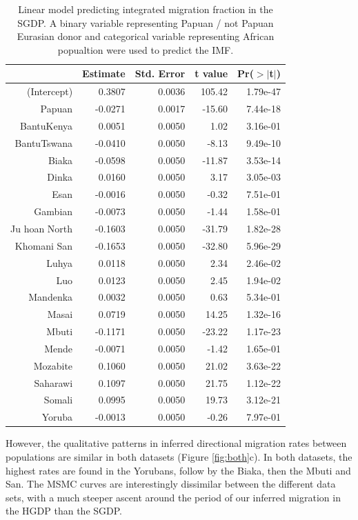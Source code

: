 \documentclass{article}
\begin{document}
\begin{table}[ht]
\centering
\begin{tabular}{rrrrr}
  \hline
 & Estimate & Std. Error & t value & Pr($>$$|$t$|$) \\ 
  \hline
(Intercept) & 0.3807 & 0.0036 & 105.42 & 1.79e-47 \\ 
  Papuan & -0.0271 & 0.0017 & -15.60 & 7.44e-18 \\ 
  BantuKenya & 0.0051 & 0.0050 & 1.02 & 3.16e-01 \\ 
  BantuTswana & -0.0410 & 0.0050 & -8.13 & 9.49e-10 \\ 
  Biaka & -0.0598 & 0.0050 & -11.87 & 3.53e-14 \\ 
  Dinka & 0.0160 & 0.0050 & 3.17 & 3.05e-03 \\ 
  Esan & -0.0016 & 0.0050 & -0.32 & 7.51e-01 \\ 
  Gambian & -0.0073 & 0.0050 & -1.44 & 1.58e-01 \\ 
  Ju hoan North & -0.1603 & 0.0050 & -31.79 & 1.82e-28 \\ 
  Khomani San & -0.1653 & 0.0050 & -32.80 & 5.96e-29 \\ 
  Luhya & 0.0118 & 0.0050 & 2.34 & 2.46e-02 \\ 
  Luo & 0.0123 & 0.0050 & 2.45 & 1.94e-02 \\ 
  Mandenka & 0.0032 & 0.0050 & 0.63 & 5.34e-01 \\ 
  Masai & 0.0719 & 0.0050 & 14.25 & 1.32e-16 \\ 
  Mbuti & -0.1171 & 0.0050 & -23.22 & 1.17e-23 \\ 
  Mende & -0.0071 & 0.0050 & -1.42 & 1.65e-01 \\ 
  Mozabite & 0.1060 & 0.0050 & 21.02 & 3.63e-22 \\ 
  Saharawi & 0.1097 & 0.0050 & 21.75 & 1.12e-22 \\ 
  Somali & 0.0995 & 0.0050 & 19.73 & 3.12e-21 \\ 
  Yoruba & -0.0013 & 0.0050 & -0.26 & 7.97e-01 \\ 
   \hline
\end{tabular}
\caption{Linear model predicting integrated migration fraction in the SGDP. A binary variable representing Papuan / not Papuan Eurasian donor and categorical variable representing African popualtion were used to predict the IMF.} 
\label{sgdp:papuan_imf}
\end{table}


However, the qualitative patterns in inferred directional migration rates between populations are similar in both datasets (Figure \ref{fig:both}c). In both datasets, the highest rates are found in the Yorubans, follow by the Biaka, then the Mbuti and San. The MSMC curves are interestingly dissimilar between the different data sets, with a much steeper ascent around the period of our inferred migration in the HGDP than the SGDP. 
\end{document}
